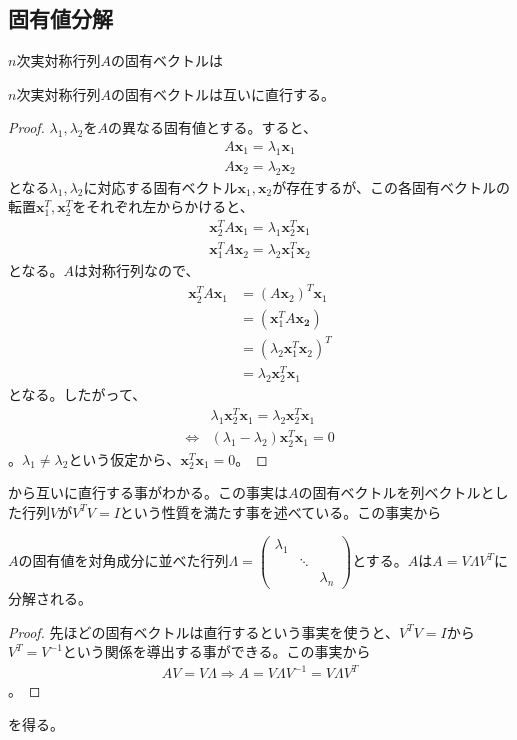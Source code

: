 \subsection{固有値分解}
$n$次実対称行列$A$の固有ベクトルは
\begin{theorem*}
  $n$次実対称行列$A$の固有ベクトルは互いに直行する。
\end{theorem*}
\begin{proof}
  $\lambda_1,\lambda_2$を$A$の異なる固有値とする。すると、
  \begin{align*}
    A \mathbf{x}_1 = \lambda_1 \mathbf{x}_1 \\
    A \mathbf{x}_2 = \lambda_2 \mathbf{x}_2
  \end{align*}
  となる$\lambda_1, \lambda_2$に対応する固有ベクトル$\mathbf{x}_1, \mathbf{x}_2$が存在するが、この各固有ベクトルの転置$\mathbf{x}_1^T, \mathbf{x}_2^T$をそれぞれ左からかけると、
  \begin{align*}
    \mathbf{x}_2^T A \mathbf{x}_1 = \lambda_1 \mathbf{x}_2^T \mathbf{x}_1 \\
    \mathbf{x}_1^T A \mathbf{x}_2 = \lambda_2 \mathbf{x}_1^T \mathbf{x}_2
  \end{align*}
  となる。$A$は対称行列なので、
  \begin{align*}
    \mathbf{x}_2^T A \mathbf{x}_1 & = (A \mathbf{x}_2)^T \mathbf{x}_1 \\
                                  & = (\mathbf{x}_1^T A \mathbf{x_2}) \\
                                  & = (\lambda_2 \mathbf{x}_1^T \mathbf{x}_2)^T \\
                                  & = \lambda_2 \mathbf{x}_2^T \mathbf{x}_1
  \end{align*}
  となる。したがって、
  \begin{align*}
                    & \lambda_1 \mathbf{x}_2^T \mathbf{x}_1 = \lambda_2 \mathbf{x}_2^T \mathbf{x}_1 \\
    \Leftrightarrow & (\lambda_1 - \lambda_2) \mathbf{x}_2^T \mathbf{x}_1 = 0
  \end{align*}
  。$\lambda_1 \not= \lambda_2$という仮定から、$\mathbf{x}_2^T \mathbf{x}_1 = 0$。
\end{proof}
から互いに直行する事がわかる。この事実は$A$の固有ベクトルを列ベクトルとした行列$V$が$V^T V = I$という性質を満たす事を述べている。この事実から
\begin{theorem*}
  $A$の固有値を対角成分に並べた行列$\Lambda = \displaystyle{\left(\begin{array}{ccc} \lambda_1 & & \\ & \ddots & \\ & & \lambda_n \end{array}\right)}$とする。$A$は$A = V \Lambda V^T$に分解される。
\end{theorem*}
\begin{proof}
  先ほどの固有ベクトルは直行するという事実を使うと、$V^T V = I$から$V^T = V^{-1}$という関係を導出する事ができる。この事実から
  \begin{align*}
    A V = V \Lambda \Rightarrow A = V \Lambda V^{-1} = V \Lambda V^T
  \end{align*}
  。
\end{proof}
を得る。

